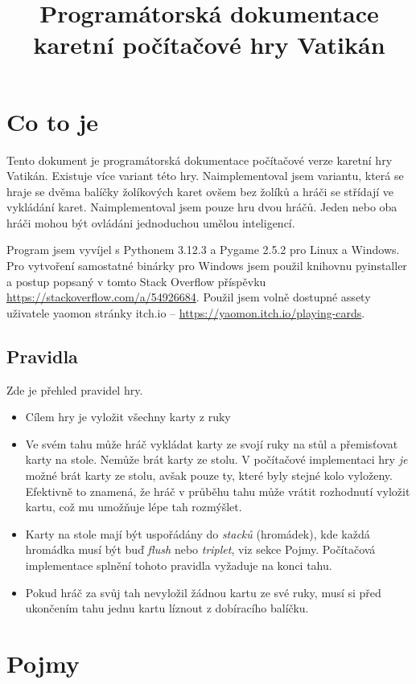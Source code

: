 \documentclass{article}
\title{Programátorská dokumentace karetní počítačové hry Vatikán}
\begin{document}
\maketitle

\section*{Co to je}

Tento dokument je programátorská dokumentace počítačové verze karetní hry
Vatikán. Existuje více variant této hry. Naimplementoval jsem variantu, která
se hraje se dvěma balíčky žolíkových karet ovšem bez žolíků a hráči se střídají
ve vykládání karet. Naimplementoval jsem pouze hru dvou hráčů. Jeden nebo
oba hráči mohou být ovládáni jednoduchou umělou inteligencí.

Program jsem vyvíjel s Pythonem 3.12.3 a Pygame 2.5.2 pro Linux a Windows. Pro
vytvoření samostatné binárky pro Windows jsem použil knihovnu pyinstaller a
postup popsaný v tomto Stack Overflow příspěvku
\url{https://stackoverflow.com/a/54926684}. Použil jsem volně dostupné assety
uživatele yaomon stránky itch.io -- \url{https://yaomon.itch.io/playing-cards}.

\subsection*{Pravidla}

Zde je přehled pravidel hry.
\begin{itemize}
	\item Cílem hry je vyložit všechny karty z ruky
	\item Ve svém tahu může hráč vykládat karty ze svojí ruky na stůl a
		přemisťovat karty na stole. Nemůže brát karty ze stolu. V
		počítačové implementaci hry \emph{je} možné brát karty ze
		stolu, avšak pouze ty, které byly stejné kolo vyloženy.
		Efektivně to znamená, že hráč v průběhu tahu může vrátit
		rozhodnutí vyložit kartu, což mu umožňuje lépe tah rozmýšlet.
	\item Karty na stole mají být uspořádány do \emph{stacků} (hromádek),
		kde každá hromádka musí být buď \emph{flush} nebo
		\emph{triplet}, viz sekce Pojmy. Počítačová implementace
		splnění tohoto pravidla vyžaduje na konci tahu.
	\item Pokud hráč za svůj tah nevyložil žádnou kartu ze své ruky, musí
		si před ukončením tahu jednu kartu líznout z dobíracího
		balíčku.
\end{itemize}

\section*{Pojmy}
\end{document}
